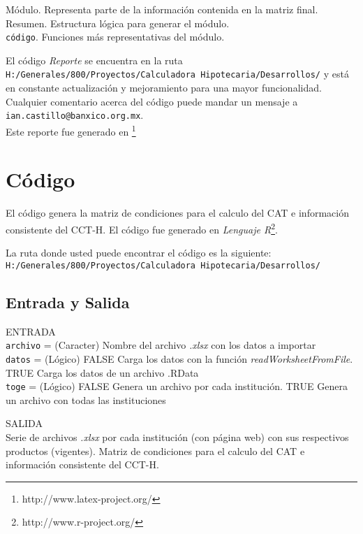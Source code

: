 \documentclass{report}
\begin{document}
\begin{flushleft}
Módulo. Representa parte de la información contenida en la matriz final. \\
Resumen. Estructura lógica para generar el módulo. \\
\texttt{código}. Funciones más representativas del módulo.
\end{flushleft}

El código \textit{Reporte} se encuentra en la ruta \texttt{H:/Generales/800/Proyectos/Calculadora Hipotecaria/Desarrollos/} y está en constante actualización y mejoramiento para una mayor funcionalidad. Cualquier comentario acerca del código puede mandar un mensaje a \texttt{ian.castillo@banxico.org.mx}. \\

Este reporte fue generado en \LaTeXe \footnote[2]{http://www.latex-project.org/}

\chapter{Código}
El código genera la matriz de condiciones para el calculo del CAT e información consistente del CCT-H. El código fue generado en \textit{Lenguaje R}\footnote[3]{http://www.r-project.org/}.

La ruta donde usted puede encontrar el código es la siguiente: \\ 
\texttt{H:/Generales/800/Proyectos/Calculadora Hipotecaria/Desarrollos/}

\section{Entrada y Salida}
    ENTRADA\\
    \texttt{archivo} = (Caracter) Nombre del archivo \textit{.xlsx} con los datos a importar\\ 
    \texttt{datos} = (Lógico) FALSE Carga los datos con la función \textit{readWorksheetFromFile}. TRUE Carga     los datos de un archivo .RData\\ 
    \texttt{toge} = (Lógico) FALSE Genera un archivo por cada institución. TRUE Genera un archivo con     todas las instituciones
    
    SALIDA\\
    Serie de archivos \textit{.xlsx} por cada institución (con página web) con sus respectivos productos (vigentes). Matriz de condiciones para el calculo del CAT e información consistente del CCT-H.
\end{document}
